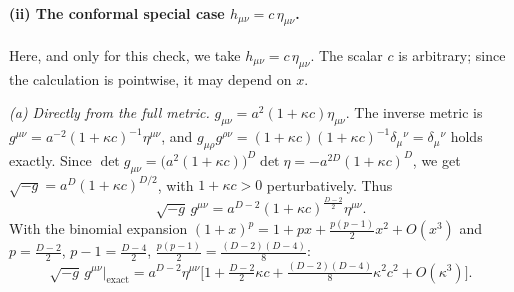 \paragraph{(ii) The conformal special case $h_{\mu\nu}=c\,\eta_{\mu\nu}$.}
Here, and only for this check, we take $h_{\mu\nu}=c\,\eta_{\mu\nu}$. The
scalar $c$ is arbitrary; since the calculation is pointwise, it may depend
on $x$.

\emph{(a) Directly from the full metric.} $g_{\mu\nu}=a^2(1+\kappa c)\eta_{\mu\nu}$.
The inverse metric is $g^{\mu\nu}=a^{-2}(1+\kappa c)^{-1}\eta^{\mu\nu}$, and
$g_{\mu\rho}g^{\rho\nu}=(1+\kappa c)(1+\kappa c)^{-1}\delta_\mu{}^\nu=\delta_\mu{}^\nu$
holds exactly. Since
$\det g_{\mu\nu}=\big(a^2(1+\kappa c)\big)^D\det\eta=-a^{2D}(1+\kappa c)^D$, we
get $\sqrt{-g}=a^D(1+\kappa c)^{D/2}$, with $1+\kappa c>0$ perturbatively. Thus
\begin{equation}
\sqrt{-g}\,g^{\mu\nu}=a^{D-2}(1+\kappa c)^{\frac{D-2}{2}}\eta^{\mu\nu}.
\label{eq:ch1-conf-exact}
\end{equation}
With the binomial expansion $(1+x)^p=1+px+\tfrac{p(p-1)}2x^2+O(x^3)$ and
$p=\tfrac{D-2}2$, $p-1=\tfrac{D-4}2$, $\tfrac{p(p-1)}2=\tfrac{(D-2)(D-4)}8$:
\begin{equation}
\sqrt{-g}\,g^{\mu\nu}\Big|_{\text{exact}}=a^{D-2}\eta^{\mu\nu}\Big[1+\tfrac{D-2}{2}\kappa c+\tfrac{(D-2)(D-4)}{8}\kappa^2c^2+O(\kappa^3)\Big].
\label{eq:ch1-conf-binom}
\end{equation}

